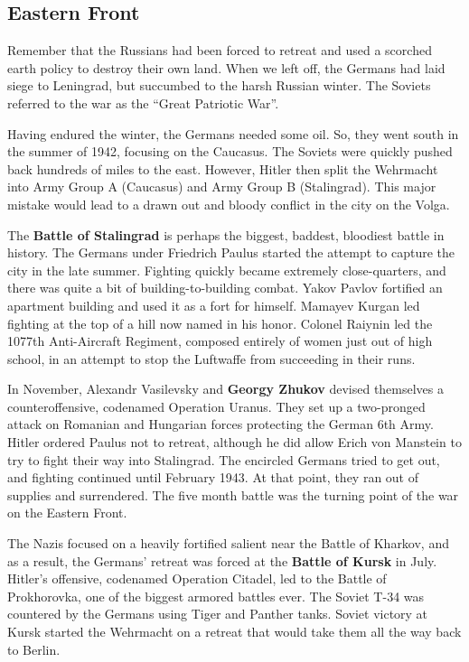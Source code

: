 \subsection*{Eastern Front}

Remember that the Russians had been forced to retreat and used a scorched earth policy to destroy their own land.
When we left off, the Germans had laid siege to Leningrad, but succumbed to the harsh Russian winter.
The Soviets referred to the war as the ``Great Patriotic War''.

Having endured the winter, the Germans needed some oil.
So, they went south in the summer of 1942, focusing on the Caucasus.
The Soviets were quickly pushed back hundreds of miles to the east.
However, Hitler then split the Wehrmacht into Army Group A (Caucasus) and Army Group B (Stalingrad).
This major mistake would lead to a drawn out and bloody conflict in the city on the Volga.

The \textbf{Battle of Stalingrad} is perhaps the biggest, baddest, bloodiest battle in history.
The Germans under Friedrich Paulus started the attempt to capture the city in the late summer.
Fighting quickly became extremely close-quarters, and there was quite a bit of building-to-building combat.
Yakov Pavlov fortified an apartment building and used it as a fort for himself.
Mamayev Kurgan led fighting at the top of a hill now named in his honor.
Colonel Raiynin led the 1077th Anti-Aircraft Regiment, composed entirely of women just out of high school,
in an attempt to stop the Luftwaffe from succeeding in their runs.

In November, Alexandr Vasilevsky and \textbf{Georgy Zhukov} devised themselves a counteroffensive,
codenamed Operation Uranus.
They set up a two-pronged attack on Romanian and Hungarian forces protecting the German 6th Army.
Hitler ordered Paulus not to retreat,
although he did allow Erich von Manstein to try to fight their way into Stalingrad.
The encircled Germans tried to get out, and fighting continued until February 1943.
At that point, they ran out of supplies and surrendered.
The five month battle was the turning point of the war on the Eastern Front.

The Nazis focused on a heavily fortified salient near the Battle of Kharkov,
and as a result, the Germans' retreat was forced at the \textbf{Battle of Kursk} in July.
Hitler's offensive, codenamed Operation Citadel,
led to the Battle of Prokhorovka, one of the biggest armored battles ever.
The Soviet T-34 was countered by the Germans using Tiger and Panther tanks.
Soviet victory at Kursk started the Wehrmacht on a retreat that would take them all the way back to Berlin.

